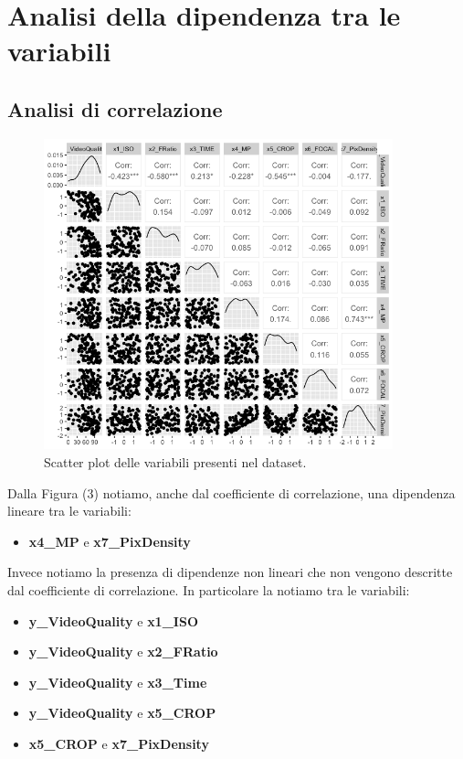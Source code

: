 \section{Analisi della dipendenza tra le variabili}


\subsection{Analisi di correlazione}

\begin{figure}[H]
	\centering
	\includegraphics[width=0.90\textwidth]{../graphs/DescriptiveStatisticPlots/ggplot}
	\caption{Scatter plot delle variabili presenti nel dataset.}
\end{figure}

Dalla Figura (3) notiamo, anche dal coefficiente di correlazione, una dipendenza lineare tra le variabili:
\begin{itemize}
	\item \textbf{x4\_MP} e \textbf{x7\_PixDensity}
\end{itemize}
Invece notiamo la presenza di dipendenze non lineari che non vengono descritte dal coefficiente di correlazione. In particolare la notiamo tra le variabili:
\begin{itemize}
	\item \textbf{y\_VideoQuality} e \textbf{x1\_ISO}
	\item \textbf{y\_VideoQuality} e \textbf{x2\_FRatio}
	\item \textbf{y\_VideoQuality} e \textbf{x3\_Time}
	\item \textbf{y\_VideoQuality} e \textbf{x5\_CROP}
	\item \textbf{x5\_CROP} e \textbf{x7\_PixDensity}
\end{itemize}

